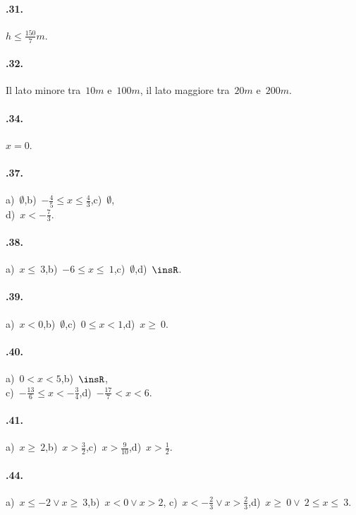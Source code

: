 \begin{multicols}{2}
\paragraph{\thechapter.31.} $h\le \frac{150}{7}m$.

\paragraph{\thechapter.32.} Il lato minore tra~$10\unit{m}$ e~$100\unit{m}$, il lato maggiore tra~$20\unit{m}$ e~$200\unit{m}$.

\paragraph{\thechapter.34.} $x = 0$.

\paragraph{\thechapter.37.} a)~$\emptyset $,\quad b)~$-{\frac{4}{5}}\le x\le\frac{4}{3}$,\quad c)~$\emptyset $,\quad
\protect\\ d)~$x<-{\frac{7}{3}}$.

\paragraph{\thechapter.38.} a)~$x\le~3$,\quad b)~$-6\le x\le~1$,\quad c)~$\emptyset $,\quad d)~$\insR$.

\paragraph{\thechapter.39.} a)~$x<0$,\quad b)~$\emptyset $,\quad c)~$0\le x<1$,\quad d)~$x\ge~0$.

\paragraph{\thechapter.40.} a)~$0<x<5$,\quad b)~$\insR$,\quad
\protect\\ c)~$-{\frac{13}{6}}\le x<-{\frac{3}{4}}$,\quad d)~$-{\frac{17}{7}}<x<6$.

\paragraph{\thechapter.41.} a)~$x\ge~2$,\quad b)~$x>\frac{3}{2}$,\quad c)~$x>\frac{9}{10}$,\quad d)~$x>\frac{1}{2}$.

\paragraph{\thechapter.44.} a)~$x\le -2\vee x\ge~3$,\quad b)~$x<0\vee x>2$,\quad
c)~$x<-{\frac{2}{3}}\vee x>\frac{2}{3}$,\quad d)~$x\ge~0\vee~2\le x\le~3$.


\end{multicols}
